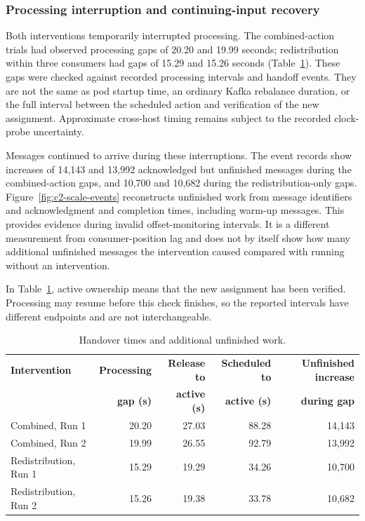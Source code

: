 \documentclass[10pt]{article}
\begin{document}
\clearpage
\subsubsection{Processing interruption and continuing-input recovery}
Both interventions temporarily interrupted processing. The combined-action trials had observed processing gaps of 20.20 and 19.99 seconds; redistribution within three consumers had gaps of 15.29 and 15.26 seconds (Table~\ref{tab:live-transition}). These gaps were checked against recorded processing intervals and handoff events. They are not the same as pod startup time, an ordinary Kafka rebalance duration, or the full interval between the scheduled action and verification of the new assignment. Approximate cross-host timing remains subject to the recorded clock-probe uncertainty.

Messages continued to arrive during these interruptions. The event records show increases of 14,143 and 13,992 acknowledged but unfinished messages during the combined-action gaps, and 10,700 and 10,682 during the redistribution-only gaps. Figure~\ref{fig:c2-scale-events} reconstructs unfinished work from message identifiers and acknowledgment and completion times, including warm-up messages. This provides evidence during invalid offset-monitoring intervals. It is a different measurement from consumer-position lag and does not by itself show how many additional unfinished messages the intervention caused compared with running without an intervention.

In Table~\ref{tab:live-transition}, active ownership means that the new assignment has been verified. Processing may resume before this check finishes, so the reported intervals have different endpoints and are not interchangeable.

\begin{table}[!htbp]
\centering\small
\setlength{\tabcolsep}{3pt}
\begin{tabular}{@{}lrrrr@{}}
\toprule
\textbf{Intervention} & \textbf{Processing} & \textbf{Release to} & \textbf{Scheduled to} & \textbf{Unfinished increase}\\
 & \textbf{gap (s)} & \textbf{active (s)} & \textbf{active (s)} & \textbf{during gap}\\
\midrule
Combined, Run 1 & 20.20 & 27.03 & 88.28 & 14,143\\
Combined, Run 2 & 19.99 & 26.55 & 92.79 & 13,992\\
Redistribution, Run 1 & 15.29 & 19.29 & 34.26 & 10,700\\
Redistribution, Run 2 & 15.26 & 19.38 & 33.78 & 10,682\\
\bottomrule
\end{tabular}
\caption{Handover times and additional unfinished work.}
\label{tab:live-transition}
\end{table}
\end{document}
